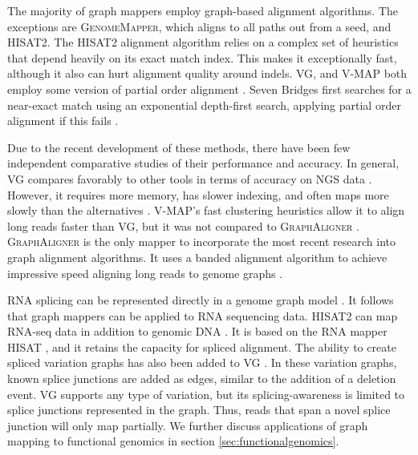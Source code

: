 The majority of graph mappers employ graph-based alignment algorithms. 
The exceptions are \textsc{GenomeMapper}, which aligns to all paths out from a seed, and \textsc{HISAT2}.
The \textsc{HISAT2} alignment algorithm relies on a complex set of heuristics that depend heavily on its exact match index.
This makes it exceptionally fast, although it also can hurt alignment quality around indels. 
\textsc{VG}, and \textsc{V-MAP} both employ some version of partial order alignment \cite{Garrison_2019, Vaddadi_2019}.
Seven Bridges first searches for a near-exact match using an exponential depth-first search, applying partial order alignment if this fails \cite{Rakocevic_2019}.

Due to the recent development of these methods, there have been few independent comparative studies of their performance and accuracy.
In general, \textsc{VG} compares favorably to other tools in terms of accuracy on NGS data \cite{Rand_2017}. 
However, it requires more memory, has slower indexing, and often maps more slowly than the alternatives \cite{Kim_2019, Vaddadi_2019}. 
\textsc{V-MAP}'s fast clustering heuristics allow it to align long reads faster than \textsc{VG}, but it was not compared to \textsc{GraphAligner} \cite{Vaddadi_2019}.
\textsc{GraphAligner} is the only mapper to incorporate the most recent research into graph alignment algorithms.
It uses a banded alignment algorithm to achieve impressive speed aligning long reads to genome graphs \cite{Rautiainen_2019b}.

RNA splicing can be represented directly in a genome graph model \cite{Lee_2002}.
It follows that graph mappers can be applied to RNA sequencing data.
\textsc{HISAT2} can map RNA-seq data in addition to genomic DNA \cite{Kim_2019}.
It is based on the RNA mapper \textsc{HISAT} \cite{Kim_2015}, and it retains the capacity for spliced alignment.
The ability to create spliced variation graphs has also been added to VG \cite{Garrison_2018}. 
In these variation graphs, known splice junctions are added as edges, similar to the addition of a deletion event.
\textsc{VG} supports any type of variation, but its splicing-awareness is limited to splice junctions represented in the graph.
Thus, reads that span a novel splice junction will only map partially.
We further discuss applications of graph mapping to functional genomics in section \ref{sec:functionalgenomics}.

